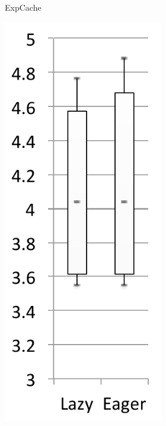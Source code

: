 \documentclass[sigplan,10pt,review,anonymous]{acmart}\settopmatter{printfolios=true,printccs=false,printacmref=false}
\begin{document}
\begin{figure}[bth]
\begin{subfigure}[b]{.48\textwidth}
\begin{subfigure}[b]{.24\textwidth}
		\caption{ExpCache}
	\end{subfigure}%
	\begin{subfigure}[b]{.24\textwidth}
		\includegraphics[width=\linewidth]{figures/netBeansRelease} 

\end{subfigure}
\end{subfigure}
\end{figure}
\end{document}
